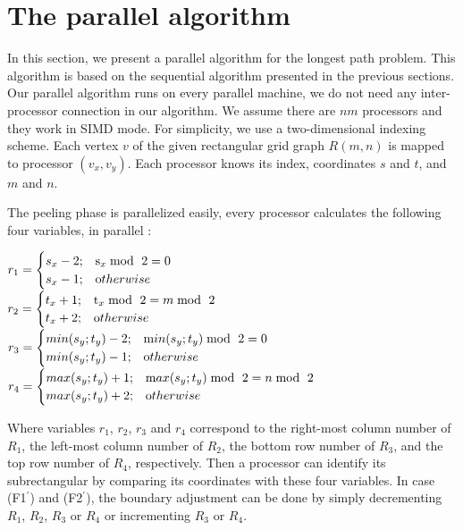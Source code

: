 \documentclass[preprint,12pt]{elsarticle}
\begin{document}
\section{The parallel algorithm}
In this section, we present a parallel algorithm for the  longest
path problem. This algorithm is based on the sequential algorithm
presented in the previous sections. Our parallel algorithm runs on
every parallel machine, we do not need any inter-processor
connection in our algorithm. We assume there are $nm$ processors and
they work in SIMD mode. For simplicity, we use a two-dimensional
indexing scheme. Each vertex $v$ of the given rectangular grid graph
$R(m,n)$ is mapped to processor $(v_x,v_y)$. Each processor knows
its index, coordinates $s$ and $t$, and $m$ and $n$. \par The
peeling phase is parallelized easily, every processor calculates the
following four variables, in parallel \cite{CST:AFAFCHPIM}:

 $r_{1}=
  \begin{cases}
  s_{x} - 2;   &  \text s_{x}\bmod \ 2=0 \\
    s_{x} - 1;& \text otherwise
  \end{cases}$
  \\

$r_{2}=
  \begin{cases}
  t_{x} +1;   &  \text t_{x}\bmod \ 2=m\bmod\ 2 \\
    t_{x} +2;& \text otherwise
  \end{cases}$
  \\

$r_{3}=
  \begin{cases}
  min(s_{y} ; t_{y})-2; & \text min(s_{y} ; t_{y})\bmod\ 2 = 0 \\
   min(s_{y} ; t_{y})-1 ;& \text  otherwise
  \end{cases}$
  \\

$r_{4}=
  \begin{cases}
  max(s_{y} ; t_{y})+1; & \text max(s_{y} ; t_{y})\bmod\ 2 = n \bmod\ 2 \\
   max(s_{y} ; t_{y})+2 ;& \text  otherwise
  \end{cases}$
  \\
  \par
Where variables $r_1$, $r_2$, $r_3$ and $r_4$ correspond to the
right-most column number of $R_1$,  the left-most column number of
$R_2$, the bottom row number of $R_3$, and the top row number of
$R_4$, respectively. Then a processor can identify its
subrectangular by comparing its coordinates with these four
variables. In case (F1$^{'}$) and (F2$^{'}$), the boundary
adjustment can be done by simply decrementing $R_{1}$, $R_{2}$,
$R_{3}$ or $R_{4}$ or incrementing $R_{3}$ or $R_{4}$.
\end{document}
